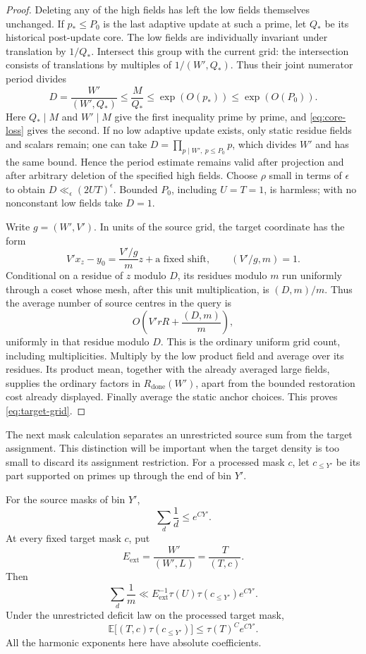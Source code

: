 \begin{proof}
Deleting any of the high fields has left the low fields themselves
unchanged.  If $p_*\le P_0$ is the last adaptive update at such a
prime, let $Q_*$ be its historical post-update core.  The low fields
are individually invariant under translation by $1/Q_*$.  Intersect
this group with the current grid: the intersection consists of
translations by multiples of $1/(W',Q_*)$.  Thus their joint numerator
period divides
\[
 D=\frac{W'}{(W',Q_*)}\le\frac{M}{Q_*}
   \le\exp(O(p_*))\le\exp(O(P_0)).
\]
Here $Q_*\mid M$ and $W'\mid M$ give the first inequality prime by
prime, and \eqref{eq:core-loss} gives the second.  If no low adaptive
update exists, only static residue fields and scalars remain; one can
take $D=\prod_{p\mid W',\ p\le P_0}p$, which divides $W'$ and has
the same bound.  Hence the period estimate remains valid after
projection and after arbitrary deletion of the specified high fields.
Choose $\rho$ small in terms of $\epsilon$ to obtain
$D\ll_\epsilon(2UT)^\epsilon$.  Bounded $P_0$, including $U=T=1$,
is harmless; with no nonconstant low fields take $D=1$.

Write $g=(W',V')$.  In units of the source grid, the target coordinate
has the form
\[
 V'x_z-y_0
   =\frac{V'/g}{m}z+\text{a fixed shift},
 \qquad (V'/g,m)=1.
\]
Conditional on a residue of $z$ modulo $D$, its residues modulo $m$
run uniformly through a coset whose mesh, after this unit
multiplication, is $(D,m)/m$.  Thus the average number of source
centres in the query is
\[
 O\left(V'rR+\frac{(D,m)}{m}\right),
\]
uniformly in that residue modulo $D$.  This is the ordinary uniform
grid count, including multiplicities.  Multiply by the low product
field and average over its residues.  Its product mean, together with
the already averaged large fields, supplies the ordinary factors in
$R_{\mathrm{done}}(W')$, apart from the bounded restoration cost
already displayed.  Finally average the static anchor choices.  This
proves \eqref{eq:target-grid}.
\end{proof}

The next mask calculation separates an unrestricted source sum from
the target assignment.  This distinction will be important when the
target density is too small to discard its assignment restriction.
For a processed mask $c$, let $c_{\le Y'}$ be its part supported on
primes up through the end of bin $Y'$.

\begin{lemma}
\label{part:mask-sums}
For the source masks of bin $Y'$,
\[
 \sum_d\frac1d\le e^{CY'}.
\]
At every fixed target mask $c$, put
\[
 E_{\mathrm{ext}}=
 \frac{W'}{(W',L)}=\frac{T}{(T,c)}.
\]
Then
\begin{equation}
 \sum_d\frac1m
 \ll E_{\mathrm{ext}}^{-1}
       \tau(U)\tau(c_{\le Y'})e^{CY'}.
\label{part:conditional-mask-sum}
\end{equation}
Under the unrestricted deficit law on the processed target mask,
\begin{equation}
 \mathbb E\bigl[(T,c)\tau(c_{\le Y'})\bigr]
 \le \tau(T)^C e^{CY'}.
\label{part:target-mask-moment}
\end{equation}
All the harmonic exponents here have absolute coefficients.
\end{lemma}

